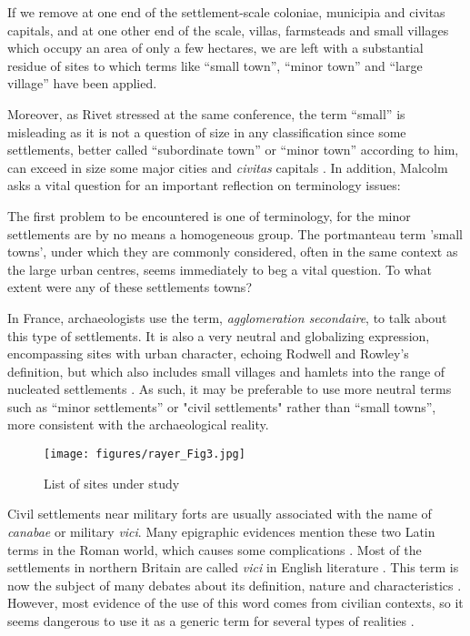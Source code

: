 \begin{aquote}{\cite[1]{Rodwell_1975}}
If we remove at one end of the settlement-scale coloniae, municipia and civitas capitals, and at one other end of the scale, villas, farmsteads and small villages which occupy an area of only a few hectares, we are left with a substantial residue of sites to which terms like “small town”, “minor town” and “large village” have been applied.
\end{aquote}
Moreover, as Rivet stressed at the same conference, the term “small” is misleading as it is not a question of size in any classification since some settlements, better called “subordinate town” or “minor town” according to him, can exceed in size some major cities and \textit{civitas} capitals \parencite[111]{Rivet_1975b}.
In addition, Malcolm \textcite[115]{Todd_1970} asks a vital question for an important reflection on terminology issues: 

\begin{aquote}{\cite[115]{Todd_1970}}
The first problem to be encountered is one of terminology, for the minor settlements are by no means a homogeneous group. The portmanteau term 'small towns', under which they are commonly considered, often in the same context as the large urban centres, seems immediately to beg a vital question. To what extent were any of these settlements towns?
\end{aquote}
In France, archaeologists use the term, \textit{agglomeration secondaire}, to talk about this type of settlements. It is also a very neutral and globalizing expression, encompassing sites with urban character, echoing Rodwell and Rowley’s definition, but which also includes small villages and hamlets into the range of nucleated settlements \parencite[18]{Mangin_1986}. As such, it may be preferable to use more neutral terms such as “minor settlements” or "civil settlements" rather than “small towns”, more consistent with the archaeological reality.

	\begin{figure}[!p]
		\texttt{[image: figures/rayer\_Fig3.jpg]}
		\caption{List of sites under study}
		\label{fig:Rayer_Fig3}
	\end{figure}

	
Civil settlements near military forts are usually associated with the name of \textit{canabae} or military \textit{vici}. Many epigraphic evidences mention these two Latin terms in the Roman world, which causes some complications \parencite[for this debate, see][]{Tarpin_2002}. Most of the settlements in northern Britain are called \textit{vici} in English literature \parencites(cf.)(){Salway_1965}{Sommer_1984}{Sommer_2006}. 
This term is now the subject of many debates about its definition, nature and characteristics \parencite{Tarpin_2002}. However, most evidence of the use of this word comes from civilian contexts, 
so it seems dangerous to use it as a generic term for several types of realities \parencites[42--43]{Favory_2012}{Tarpin_2002}.	
	

